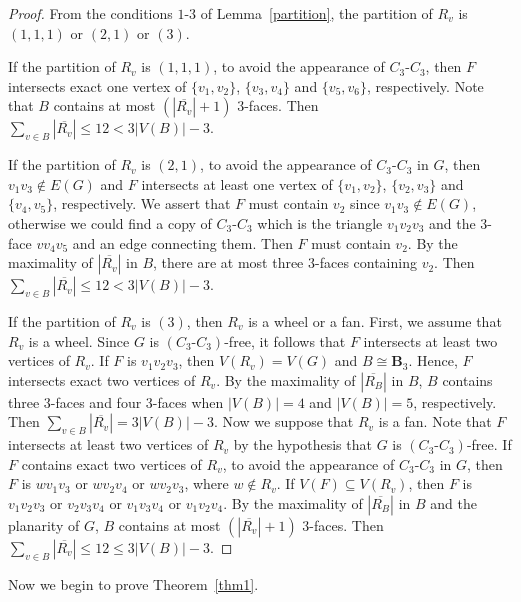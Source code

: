 \documentclass[12pt]{article}
\begin{document}
\begin{proof}
    From the conditions $1$-$3$ of Lemma~\ref{partition}, the partition of $R_v$ is $(1,1,1)$ or $(2,1)$ or $(3)$.
    
    If the partition of $R_v$ is $(1,1,1)$, to avoid the appearance of $C_3\textbf{-}C_3$, then $F$ intersects exact one vertex of $\{v_1,v_2\}$, $\{v_3,v_4\}$ and $\{v_5,v_6\}$, respectively. Note that $B$ contains at most $(|\overline{R_v}|+1)$ $3$-faces. Then $\sum_{v \in B}|\overline{R_v}| \leq 12 < 3|V(B)|-3$.

    If the partition of $R_v$ is $(2,1)$, to avoid the appearance of $C_3\textbf{-}C_3$ in $G$, then $v_1v_3\notin E(G)$ and $F$ intersects at least one vertex of $\{v_1,v_2\}$, $\{v_2,v_3\}$ and $\{v_4,v_5\}$, respectively. 
    We assert that $F$ must contain $v_2$ since $v_1v_3\notin E(G)$, otherwise we could find a copy of $C_3\textbf{-}C_3$ which is the triangle $v_1v_2v_3$ and the $3$-face $vv_4v_5$ and an edge connecting them. 
    Then $F$ must contain $v_2$. By the maximality of $|\overline{R_v}|$ in $B$, there are at most three $3$-faces containing $v_2$. 
    Then $\sum_{v \in B}|\overline{R_v}| \leq 12 < 3|V(B)|-3$.

    If the partition of $R_v$ is $(3)$, then $R_v$ is a wheel or a fan. First, we assume that $R_v$ is a wheel.
    Since $G$ is $(C_3\textbf{-}C_3)$-free, it follows that $F$ intersects at least two vertices of $R_v$.
    If $F$ is $v_1v_2v_3$, then $V(R_v)=V(G)$ and $B\cong\mathbf{B}_3$.
    Hence, $F$ intersects exact two vertices of $R_v$.
    By the maximality of $|\overline{R_B}|$ in $B$, $B$ contains three $3$-faces and four $3$-faces when $|V(B)|=4$ and $|V(B)|=5$, respectively. 
    Then $\sum_{v \in B}|\overline{R_v}| = 3|V(B)|-3$.
    Now we suppose that $R_v$ is a fan. Note that $F$ intersects at least two vertices of $R_v$ by the hypothesis that $G$ is $(C_3\textbf{-}C_3)$-free. 
    If $F$ contains exact two vertices of $R_v$, to avoid the appearance of $C_3\textbf{-}C_3$ in $G$, then $F$ is $wv_1v_3$ or $wv_2v_4$ or $wv_2v_3$, where $w\notin R_v$.
    If $V(F)\subseteq V(R_v)$, then $F$ is $v_1v_2v_3$ or $v_2v_3v_4$ or $v_1v_3v_4$ or $v_1v_2v_4$.
    By the maximality of $|\overline{R_B}|$ in $B$ and the planarity of $G$, $B$ contains at most $(|\overline{R_v}|+1)$ $3$-faces. 
    Then $\sum_{v \in B}|\overline{R_v}| \leq 12 \leq 3|V(B)|-3$.
\end{proof}
 
Now we begin to prove Theorem~\ref{thm1}.
\end{document}
